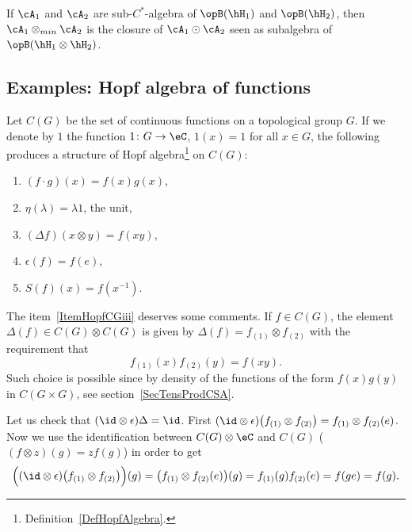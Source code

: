 \begin{lemma}
	If $\cA_1$ and $\cA_2$ are sub-$C^*$-algebra of $\opB(\hH_1)$ and $\opB(\hH_2)$, then $\cA_1\otimes_{min}\cA_2$ is the closure of $\cA_1\odot\cA_2$ seen as subalgebra of $\opB(\hH_1\otimes\hH_2)$.
\end{lemma}

\subsection{Examples: Hopf algebra of functions}

\begin{definition}		\label{DefHopfsurCG}
	Let $C(G)$ be the set of continuous functions on a topological group $G$. If we denote by $1$ the function $1\colon G\to \eC$, $1(x)=1$ for all $x\in G$, the following produces a structure of Hopf algebra\footnote{Definition~\ref{DefHopfAlgebra}.} on $C(G)$:
	\begin{enumerate}
		\item
		      $(f\cdot g)(x)=f(x)g(x)$,
		\item
		      $\eta(\lambda)=\lambda 1$, the unit,
		      \item\label{ItemHopfCGiii}
		      $(\Delta f)(x\otimes y)=f(xy)$,
		      \item\label{ItemHopfCGiv}
		      $\epsilon(f)=f(e)$,
		\item
		      $S(f)(x)=f(x^{-1})$.
	\end{enumerate}
\end{definition}

The item~\ref{ItemHopfCGiii} deserves some comments. If $f\in C(G)$, the element $\Delta(f)\in C(G)\otimes C(G)$ is given by $\Delta(f)=f_{(1)}\otimes f_{(2)}$ with the requirement that
\begin{equation}
	f_{(1)}(x)f_{(2)}(y)=f(xy).
\end{equation}
Such choice is possible since by density of the functions of the form $f(x)g(y)$ in $C(G\times G)$, see section~\ref{SecTensProdCSA}.

Let us check that $(\id\otimes\epsilon)\Delta=\id$. First $(\id\otimes\epsilon)\big( f_{(1)}\otimes f_{(2)} \big)=f_{(1)}\otimes f_{(2)}(e)$. Now we use the identification between $C(G)\otimes \eC$ and $C(G)$ ($(f\otimes z)(g)=zf(g)$) in order to get
\begin{equation}
	\Big( (\id\otimes\epsilon)\big( f_{(1)}\otimes f_{(2)} \big) \Big)(g)=\big( f_{(1)}\otimes f_{(2)}(e) \big)(g)=f_{(1)}(g)f_{(2)}(e)=f(ge)=f(g).
\end{equation}

